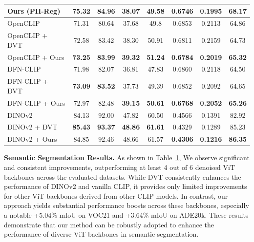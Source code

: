 \documentclass{article}
\begin{document}
\begin{table}[t!]
{\begin{tabular}{l|cc|cc|ccc}
Ours (PH-Reg)           & \textbf{75.32} & \textbf{84.96} & \textbf{38.07} & \textbf{49.58} & 0.6746 & \textbf{0.1995} & \textbf{68.17} \\ \hline
OpenCLIP~\citep{ilharco_gabriel_2021_5143773}                & 71.31          & 80.64          & 37.68          & 49.8           & 0.6853          & 0.2113          & 64.86          \\
OpenCLIP + DVT~\citep{ilharco_gabriel_2021_5143773,yang2024denoising}             & 72.58          & 83.42          & 38.30          & 50.91          & 0.6811          & 0.2159          & 64.73          \\
OpenCLIP + Ours           & \textbf{73.25} & \textbf{83.99} & \textbf{39.32} & \textbf{51.24} & \textbf{0.6784} & \textbf{0.2019} & \textbf{65.32} \\ \hline
DFN-CLIP~\citep{fang2023data}                & 71.98          & 82.07          & 36.81          & 47.83          & 0.6860          & 0.2118          & 64.50          \\
DFN-CLIP + DVT~\citep{fang2023data, yang2024denoising}            & \textbf{73.09}          & \textbf{83.52}         & 37.73          & 49.39          & 0.6852          & 0.2092          & 64.65          \\
DFN-CLIP + Ours           & 72.97 & 82.48 & \textbf{39.15} & \textbf{50.61} & \textbf{0.6768} & \textbf{0.2052} & \textbf{65.26} \\ \hline
DINOv2~\cite{oquab2023dinov2}                  & 84.13          & 92.00             & 47.82          & 60.50           & 0.4566          & 0.1391          & 82.92          \\
DINOv2 + DVT~\citep{oquab2023dinov2,yang2024denoising}              & \textbf{85.43}         & \textbf{93.37}          & \textbf{48.86}          & \textbf{61.61}          & 0.4329          & 0.1289          & 85.23          \\
DINOv2 + Ours            & 84.85 & 92.46 & 48.66 & 61.57 & \textbf{0.4306} & \textbf{0.1216} & \textbf{86.35} \\ \hline
\end{tabular}}
\vspace{-.2cm}
\label{tab:linear}
\end{table} 
\textbf{Semantic Segmentation Results.}  As shown in Table~\ref{tab:linear}, We observe significant and consistent improvements, outperforming at least 4 out of 6 denoised ViT backbones across the evaluated datasets. 
While DVT consistently enhances the performance of DINOv2 and vanilla CLIP, it provides only limited improvements for other ViT backbones derived from other CLIP models. 
In contrast, our approach yields substantial performance boosts across these backbones, especially a notable +5.04\% mIoU on VOC21 and +3.64\% mIoU on ADE20k. These results demonstrate that our method can be robustly adopted to enhance the performance of diverse ViT backbones in semantic segmentation.
\end{document}
